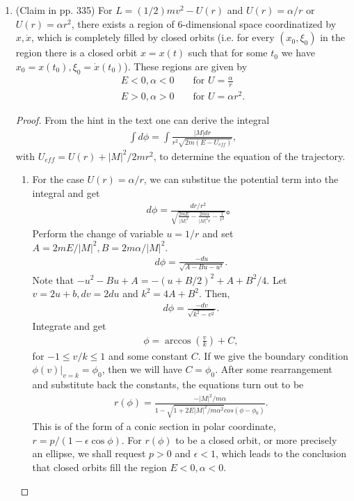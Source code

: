 \begin{enumerate}
	\item (Claim in pp. 335) For $L = (1/2)mv^2 - U(r)$ and $U(r) = \alpha/r$ or $U(r) = \alpha r^2$, there exists a region of 6-dimensional space coordinatized by $x, \dot{x}$, which is completely filled by closed orbits (i.e. for every $(x_0, \xi_0)$ in the region there is a closed orbit $x = x(t)$ such that for some $t_0$ we have $x_0 = x(t_0), \xi_0 = \dot{x}(t_0)$). These regions are given by
	\begin{eqnarray}
		E < 0, \alpha < 0&& \text{ for } U = \frac{\alpha}{r}
		\nonumber\\
		E > 0, \alpha > 0 && \text{ for } U = \alpha r^2.
		\nonumber 
	\end{eqnarray}
	\begin{proof}
		From the hint in the text one can derive the integral
		\begin{eqnarray}
			\int d\phi = \int \frac{|M|dr}{ r^2 \sqrt{2m(E - U_{eff})} },
		\end{eqnarray}
		with $U_{eff} = U(r) + |M|^2/2mr^2$, to determine the equation of the trajectory.
		\begin{enumerate}
			\item For the case $U(r) = \alpha / r$, we can substitue the potential term into the integral and get
			\begin{eqnarray}
				d\phi = \frac{dr / r^2}{\sqrt{\frac{2mE}{|M|^2} - \frac{2m\alpha}{|M|^2r} - \frac{1}{r^2}}}。
			\end{eqnarray}
			Perform the change of variable $u = 1/r$ and set $A = 2mE/|M|^2, B = 2m\alpha/|M|^2$.
			\begin{eqnarray}
				d\phi = \frac{-du}{\sqrt{A - Bu -u^2}}.
			\end{eqnarray}
			Note that $-u^2 - Bu + A = -(u + B/2)^2 + A + B^2/4$. Let $v = 2u + b, dv = 2du$ and $k^2 = 4A+B^2$. Then,
			\begin{eqnarray}
				d\phi = \frac{-dv}{\sqrt{k^2 - v^2}}.
			\end{eqnarray}
			Integrate and get
			\begin{eqnarray}
				\phi = \arccos \left( \frac{v}{k} \right) + C,
			\end{eqnarray}
			for $-1 \leq v/k \leq 1$ and some constant $C$. If we give the boundary condition $\phi(v)|_{v = k} = \phi_0$, then we will have $C = \phi_0$. After some rearrangement and substitute back the constants, the equations turn out to be
			\begin{eqnarray}
				r(\phi) = \frac{-|M|^2/m\alpha}{1 - \sqrt{1 + 2E|M|^2 / m\alpha^2} cos(\phi - \phi_0)}.
			\end{eqnarray}
			This is of the form of a conic section in polar coordinate, $r = p/(1 - \epsilon \cos\phi)$. For $r(\phi )$ to be a closed orbit, or more precisely an ellipse, we shall request $p > 0$ and $\epsilon < 1$, which leads to the conclusion that closed orbits fill the region $E < 0, \alpha < 0$.
			

\end{enumerate}
\end{proof}
\end{enumerate}
